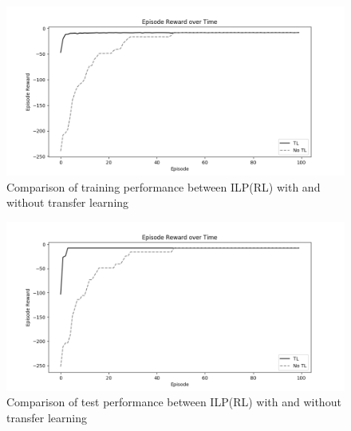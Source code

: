 \begin{figure}[!htb]
\centering
\includegraphics[width=1.0\textwidth]{./figures/experiment5_training}
\caption{Comparison of training performance between ILP(RL) with and without transfer learning}
\label{experiment5_training}
\end{figure}

\begin{figure}[!htb]
\centering
\includegraphics[width=1.0\textwidth]{./figures/experiment5_test}
\caption{Comparison of test performance between ILP(RL) with and without transfer learning}
\label{experiment5_test}
\end{figure}

